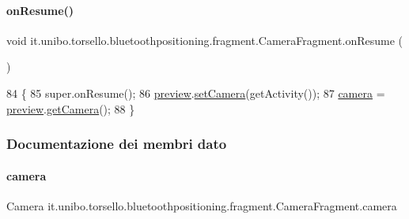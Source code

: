 \paragraph{\texorpdfstring{on\+Resume()}{onResume()}}
{\footnotesize\ttfamily void it.\+unibo.\+torsello.\+bluetoothpositioning.\+fragment.\+Camera\+Fragment.\+on\+Resume (\begin{DoxyParamCaption}{ }\end{DoxyParamCaption})}


\begin{DoxyCode}
84                            \{
85         super.onResume();
86         \hyperlink{classit_1_1unibo_1_1torsello_1_1bluetoothpositioning_1_1fragment_1_1CameraFragment_af14f8f1e4107c9a9063cf70d1fbb5bb5_af14f8f1e4107c9a9063cf70d1fbb5bb5}{preview}.\hyperlink{classit_1_1unibo_1_1torsello_1_1bluetoothpositioning_1_1util_1_1CameraPreviewUtil_acc49f348e381371fcad9d428ea4a15ca_acc49f348e381371fcad9d428ea4a15ca}{setCamera}(getActivity());
87         \hyperlink{classit_1_1unibo_1_1torsello_1_1bluetoothpositioning_1_1fragment_1_1CameraFragment_a70e1c67d2b127530751de08cb289b4c3_a70e1c67d2b127530751de08cb289b4c3}{camera} = \hyperlink{classit_1_1unibo_1_1torsello_1_1bluetoothpositioning_1_1fragment_1_1CameraFragment_af14f8f1e4107c9a9063cf70d1fbb5bb5_af14f8f1e4107c9a9063cf70d1fbb5bb5}{preview}.\hyperlink{classit_1_1unibo_1_1torsello_1_1bluetoothpositioning_1_1util_1_1CameraPreviewUtil_a24b83bd2a152f8f12824ccf190a90369_a24b83bd2a152f8f12824ccf190a90369}{getCamera}();
88     \}
\end{DoxyCode}


\subsubsection{Documentazione dei membri dato}
\hypertarget{classit_1_1unibo_1_1torsello_1_1bluetoothpositioning_1_1fragment_1_1CameraFragment_a70e1c67d2b127530751de08cb289b4c3_a70e1c67d2b127530751de08cb289b4c3}{}\label{classit_1_1unibo_1_1torsello_1_1bluetoothpositioning_1_1fragment_1_1CameraFragment_a70e1c67d2b127530751de08cb289b4c3_a70e1c67d2b127530751de08cb289b4c3} 
\paragraph{\texorpdfstring{camera}{camera}}
{\footnotesize\ttfamily Camera it.\+unibo.\+torsello.\+bluetoothpositioning.\+fragment.\+Camera\+Fragment.\+camera\hspace{0.3cm}{\ttfamily [private]}}

